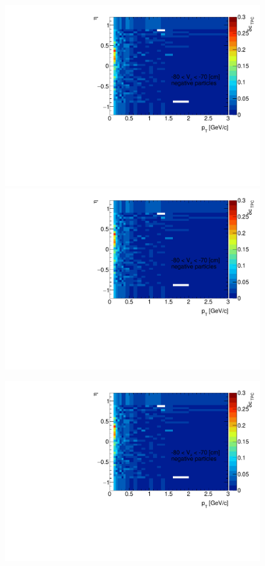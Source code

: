 \begin{figure}[H]
{		\includegraphics[width=\linewidth,page=27]{graphics/systematicsEfficiency/deadMaterial/secondaries_Unbinned_Charged_CD.pdf}
		\includegraphics[width=\linewidth,page=30]{graphics/systematicsEfficiency/deadMaterial/secondaries_Unbinned_Charged_CD.pdf}\\
	}%
	\parbox{0.325\textwidth}{
		\includegraphics[width=\linewidth,page=19]{graphics/systematicsEfficiency/deadMaterial/secondaries_Unbinned_Charged_CD.pdf}\\
}
\end{figure}
